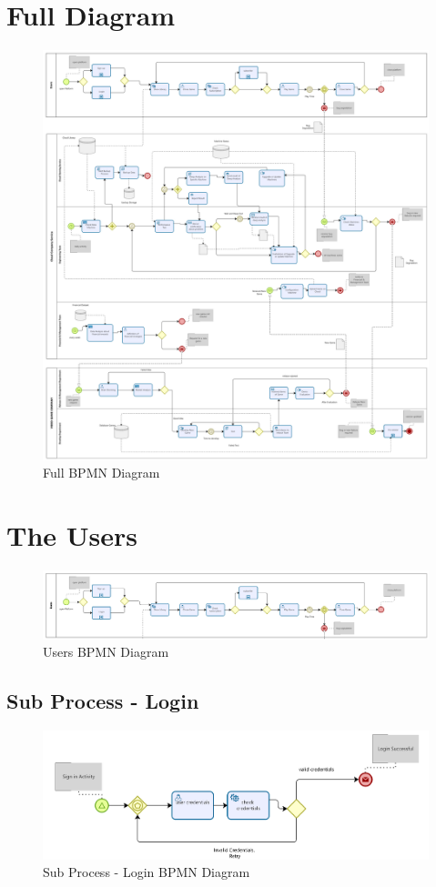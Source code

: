 \documentclass[a4paper,12pt]{report}
\begin{document}
\section{Full Diagram}
\begin{figure}[H]
 \centering
\includegraphics[scale=0.15]{Full_BPMN}
\caption{Full BPMN Diagram}
\label{FULL BPMN}
\end{figure} 
%
%
\section{The Users}
\begin{figure}[H]
 \centering
\includegraphics[scale=0.16]{user_BPMN}
\caption{Users BPMN Diagram}
\label{Users BPMN}
\end{figure} 

\subsection{Sub Process - Login }
\begin{figure}[H]
 \centering
\includegraphics[scale=0.35]{login_BPMN}
\caption{Sub Process - Login BPMN Diagram}
\label{Login BPMN}

\end{figure} 
\end{document}
